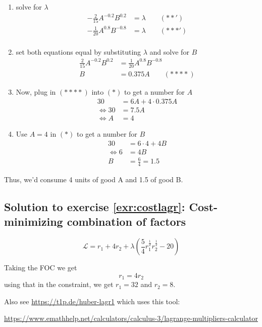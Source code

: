 \documentclass[
  12pt,
  oneside]{book}
\providecommand{\tightlist}{%
  \setlength{\itemsep}{0pt}\setlength{\parskip}{0pt}}
\theoremstyle{definition}
\theoremstyle{definition}
\theoremstyle{definition}
\theoremstyle{definition}
\theoremstyle{remark}
\begin{document}
\begin{enumerate}
\def\labelenumi{\arabic{enumi}.}
\tightlist
\item
  solve for \(\lambda\)
  \begin{align*}
  -\frac{2}{15} A^{-0.2}B^{0.2}&=\lambda \qquad (**')\\
  -\frac{1}{20} A^{0.8}B^{-0.8}&=\lambda \qquad (***')\\
  \end{align*}
\item
  set both equations equal by substituting \(\lambda\) and solve for \(B\)
  \begin{align*}
  \frac{2}{15} A^{-0.2}B^{0.2}&=  \frac{1}{20} A^{0.8}B^{-0.8}\\
  B&=0.375A \qquad (****) %
  \end{align*}
\item
  Now, plug in \((****)\) into \((*)\) to get a number for \(A\)
  \begin{align*}
  30&=6A+4\cdot 0.375 A\\
  \Leftrightarrow 30&=7.5A\\
  \Leftrightarrow A&=4
  \end{align*}
\item
  Use \(A=4\) in \((*)\) to get a number for \(B\)
  \begin{align*}
  30&=6\cdot 4+4 B\\
  \Leftrightarrow 6&=4B\\
  B&=\frac{6}{4}=1.5
  \end{align*}
\end{enumerate}

Thus, we'd consume 4 units of good A and 1.5 of good B.

\hypertarget{sol:costlagr}{%
\subsection*{Solution to exercise \ref{exr:costlagr}: Cost-minimizing combination of factors}\label{sol:costlagr}}

\[\mathcal{L}=r_1+4r_2+\lambda\left(\frac{5}{4}r_1^{\frac{1}{2}}r_2^{\frac{1}{2}}-20\right)\]

Taking the FOC we get \[r_1=4r_2\] using that in the constraint, we get \(r_1=32\) and \(r_2=8\).

Also see \url{https://t1p.de/huber-lagr1} which uses this tool:

\url{https://www.emathhelp.net/calculators/calculus-3/lagrange-multipliers-calculator}
\end{document}
